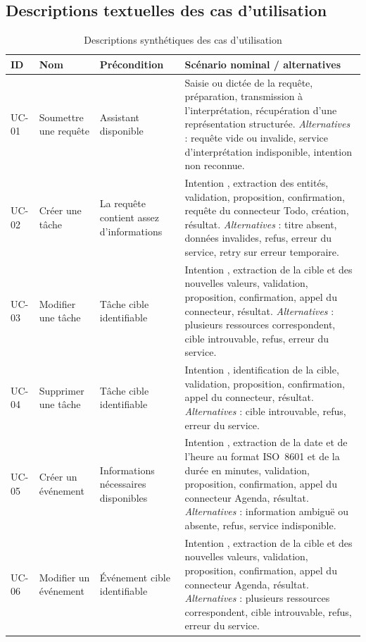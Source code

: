 \documentclass[11pt,a4paper,openany,oneside]{report}
\newcommand{\intent}[1]{\texttt{\detokenize{#1}}}
\begin{document}
\subsection{Descriptions textuelles des cas d'utilisation}
\begin{table}[htbp]
\centering\scriptsize
\caption{Descriptions synthétiques des cas d'utilisation}\label{tab:uc}
\begin{tabularx}{\textwidth}{@{}p{0.9cm}p{2.1cm}p{2.7cm}X@{}}
\toprule
\textbf{ID} & \textbf{Nom} & \textbf{Précondition} & \textbf{Scénario nominal / alternatives} \\
\midrule
UC-01 & Soumettre une requête & Assistant disponible & Saisie ou dictée de la requête, préparation, transmission à l'interprétation, récupération d'une représentation structurée. \emph{Alternatives} : requête vide ou invalide, service d'interprétation indisponible, intention non reconnue. \\
UC-02 & Créer une tâche & La requête contient assez d'informations & Intention \intent{create_task}, extraction des entités, validation, proposition, confirmation, requête du connecteur Todo, création, résultat. \emph{Alternatives} : titre absent, données invalides, refus, erreur du service, retry sur erreur temporaire. \\
UC-03 & Modifier une tâche & Tâche cible identifiable & Intention \intent{modify_task}, extraction de la cible et des nouvelles valeurs, validation, proposition, confirmation, appel du connecteur, résultat. \emph{Alternatives} : plusieurs ressources correspondent, cible introuvable, refus, erreur du service. \\
UC-04 & Supprimer une tâche & Tâche cible identifiable & Intention \intent{delete_task}, identification de la cible, validation, proposition, confirmation, appel du connecteur, résultat. \emph{Alternatives} : cible introuvable, refus, erreur du service. \\
UC-05 & Créer un événement & Informations nécessaires disponibles & Intention \intent{create_event}, extraction de la date et de l'heure au format ISO~8601 et de la durée en minutes, validation, proposition, confirmation, appel du connecteur Agenda, résultat. \emph{Alternatives} : information ambiguë ou absente, refus, service indisponible. \\
UC-06 & Modifier un événement & Événement cible identifiable & Intention \intent{modify_event}, extraction de la cible et des nouvelles valeurs, validation, proposition, confirmation, appel du connecteur Agenda, résultat. \emph{Alternatives} : plusieurs ressources correspondent, cible introuvable, refus, erreur du service. \\

\end{tabularx}
\end{table}
\end{document}
